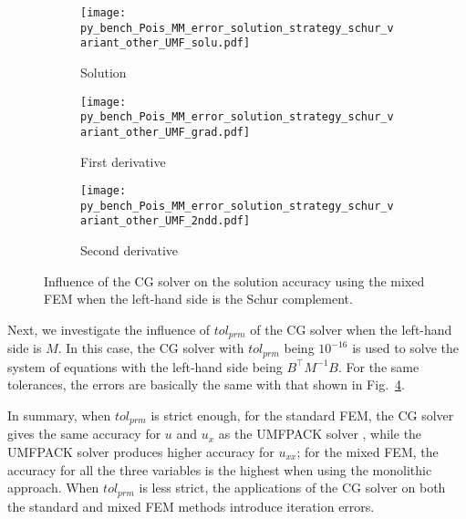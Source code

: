 \documentclass[review,3p]{elsarticle}
\begin{document}
\begin{figure}[!ht]
    \begin{subfigure}{5.5cm}
        \texttt{[image: py\_bench\_Pois\_MM\_error\_solution\_strategy\_schur\_variant\_other\_UMF\_solu.pdf]}
        \caption{Solution}
        \label{Fig:py_bench_Pois_MM_error_solution_strategy_schur_variant_other_UMF_solu}
    \end{subfigure}
    \hspace{-0.2cm}
    \begin{subfigure}{5.5cm}
        \texttt{[image: py\_bench\_Pois\_MM\_error\_solution\_strategy\_schur\_variant\_other\_UMF\_grad.pdf]}
        \caption{First derivative}
        \label{Fig:py_bench_Pois_MM_error_solution_strategy_schur_variant_other_UMF_grad}
    \end{subfigure}
    \hspace{-0.2cm}
    \begin{subfigure}{5.5cm}
        \texttt{[image: py\_bench\_Pois\_MM\_error\_solution\_strategy\_schur\_variant\_other\_UMF\_2ndd.pdf]}
        \caption{Second derivative}
        \label{Fig:py_bench_Pois_MM_error_solution_strategy_schur_variant_other_UMF_2ndd}
    \end{subfigure}
\caption{Influence of the CG solver on the solution accuracy using the mixed FEM when the left-hand side is the Schur complement.}
\label{Fig:py_bench_Pois_MM_error_solution_strategy_schur_variant_other_UMF}
\end{figure}

Next, we investigate the influence of $tol_{prm}$ of the CG solver when the left-hand side is $M$. In this case, the CG solver with $tol_{prm}$ being $10^{-16}$ is used to solve the system of equations with the left-hand side being $B^{\top}M^{-1}B$. For the same tolerances, the errors are basically the same with that shown in Fig.~\ref{Fig:py_bench_Pois_MM_error_solution_strategy_schur_variant_other_UMF}.

In summary, when $tol_{prm}$ is strict enough, for the standard FEM, the CG solver gives the same accuracy for $u$ and $u_{x}$ as the UMFPACK solver , while the UMFPACK solver produces higher accuracy for $u_{xx}$; for the mixed FEM, the accuracy for all the three variables is the highest when using the monolithic approach. When $tol_{prm}$ is less strict, the applications of the CG solver on both the standard and mixed FEM methods introduce iteration errors.

\end{document}
